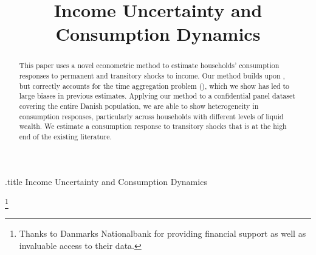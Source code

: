 \documentclass[titlepage]{\econtex}\newcommand{\texname}{IncomeUncertainty}
\begin{document}

	


\begin{verbatimwrite}{\jobname.title}
Income Uncertainty and Consumption Dynamics
\end{verbatimwrite}

\hfill{\tiny \jobname}

\title{Income Uncertainty and \\ Consumption Dynamics}



\maketitle

\begin{abstract}
    This paper uses a novel econometric method to estimate households' consumption responses to permanent and transitory shocks to income. Our method builds upon \cite{blundell_consumption_2008}, but correctly accounts for the time aggregation problem (\cite{working_note_1960}), which we show has led to large biases in previous estimates. Applying our method to a confidential panel dataset covering the entire Danish population, we are able to show heterogeneity in consumption responses, particularly across households with different levels of liquid wealth. We estimate a consumption response to transitory shocks that is at the high end of the existing literature.
  
\end{abstract}


\begin{authorsinfo}
\end{authorsinfo}
\thanks{Thanks to Danmarks Nationalbank for providing financial support as well as invaluable access to their data.}
\end{document}
